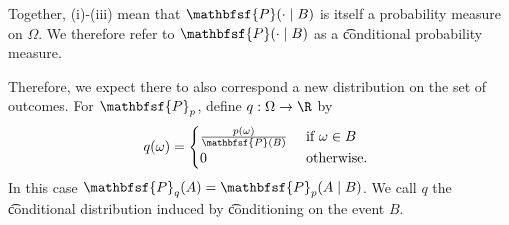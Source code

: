 Together, (i)-(iii) mean that $\mathbfsf{P} (\cdot \mid B)$ is itself a probability measure on $\Omega $.
We therefore refer to $\mathbfsf{P} (\cdot \mid B)$ as a \t{conditional probability measure}.

Therefore, we expect there to also correspond a new distribution on the set of outcomes.
For $\mathbfsf{P} _p$, define $q: \Omega  \to \R $ by
  \[
q(\omega ) = \begin{cases}
\frac{p(\omega )}{\mathbfsf{P} (B)} & \text{ if } \omega  \in B \\
0 & \text{ otherwise. } \\
\end{cases}
  \]
In this case $\mathbfsf{P} _q(A) = \mathbfsf{P} _p(A \mid B)$.
We call $q$ the \t{conditional distribution} induced by \t{conditioning on} the event $B$.
